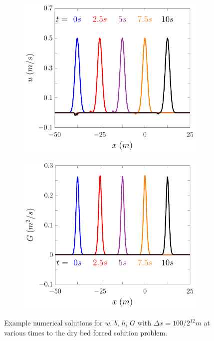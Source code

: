 \documentclass[times]{elsarticle}
\begin{document}
\begin{figure}
\begin{subfigure}{0.5\textwidth}
		\vspace{0.2cm}
	\end{subfigure}
	\begin{subfigure}{0.5\textwidth}
\includegraphics[width=\textwidth]{./Figures/Forced/Dry1/u.pdf}
		\vspace{0.2cm}
	\end{subfigure}%
	\begin{subfigure}{0.5\textwidth}
\includegraphics[width=\textwidth]{./Figures/Forced/Dry1/G.pdf}
		\vspace{0.2cm}
	\end{subfigure}
	\caption{Example numerical solutions for $w$, $b$, $h$, $G$ with $\Delta x = 100 / 2^{12}m$ at various times to the dry bed forced solution problem.}
	\label{fig:ExampleForcedSolutionDry}
\end{figure}
\end{document}
